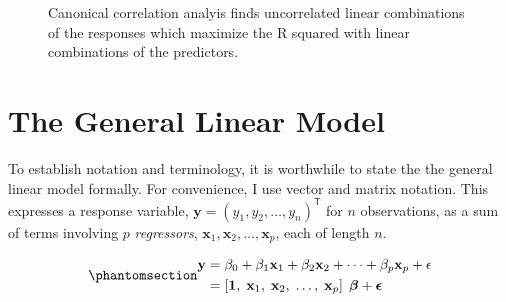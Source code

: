 \documentclass[
  letterpaper,
  10pt,
  krantz2]{krantz}
\begin{document}
\begin{figure}


\caption{\label{fig-lin-comb4}Canonical correlation analyis finds
uncorrelated linear combinations of the responses which maximize the R
squared with linear combinations of the predictors.}

\end{figure}%

\section{The General Linear Model}\label{sec-GLM}

To establish notation and terminology, it is worthwhile to state the the
general linear model formally. For convenience, I use vector and matrix
notation. This expresses a response variable,
\(\mathbf{y} = (y_1, y_2, \dots , y_n)^\mathsf{T}\) for \(n\)
observations, as a sum of terms involving \(p\) \emph{regressors},
\(\mathbf{x}_1, \mathbf{x}_2, \dots , \mathbf{x}_p\), each of length
\(n\).

\begin{equation}\phantomsection\label{eq-glm}{
\begin{align*}
\mathbf{y} & = \beta_0 + \beta_1 \mathbf{x}_1 + \beta_2 \mathbf{x}_2 + \cdots + \beta_p \mathbf{x}_p + \mathbf{\epsilon} \\
           & = \left[ \mathbf{1},\; \mathbf{x}_1,\; \mathbf{x}_2,\; \dots ,\; \mathbf{x}_p \right] \; \boldsymbol{\beta} + \boldsymbol{\epsilon} \\
\end{align*}
}\end{equation}
\end{document}
